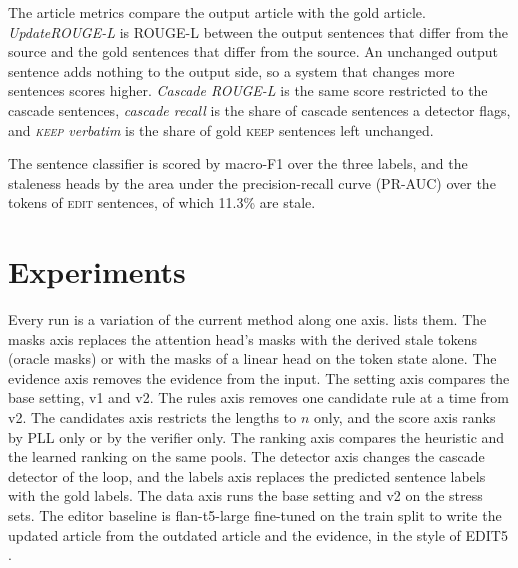 \documentclass[]{paper}
\newcommand{\keep}{\textsc{keep}}
\newcommand{\edit}{\textsc{edit}}
\begin{document}
The article metrics compare the output article with the gold article. \emph{UpdateROUGE-L} \citep{iv-etal-2022-fruit} is ROUGE-L between the output sentences that differ from the source and the gold sentences that differ from the source. An unchanged output sentence adds nothing to the output side, so a system that changes more sentences scores higher. \emph{Cascade ROUGE-L} is the same score restricted to the cascade sentences, \emph{cascade recall} is the share of cascade sentences a detector flags, and \emph{\keep{} verbatim} is the share of gold \keep{} sentences left unchanged.

The sentence classifier is scored by macro-F1 over the three labels, and the staleness heads by the area under the precision-recall curve (PR-AUC) over the tokens of \edit{} sentences, of which 11.3\% are stale.

\section{Experiments}
\label{sec:experiments}

Every run is a variation of the current method along one axis.  lists them. The masks axis replaces the attention head's masks with the derived stale tokens (oracle masks) or with the masks of a linear head on the token state alone. The evidence axis removes the evidence from the input. The setting axis compares the base setting, v1 and v2. The rules axis removes one candidate rule at a time from v2. The candidates axis restricts the lengths to $n$ only, and the score axis ranks by PLL only or by the verifier only. The ranking axis compares the heuristic and the learned ranking on the same pools. The detector axis changes the cascade detector of the loop, and the labels axis replaces the predicted sentence labels with the gold labels. The data axis runs the base setting and v2 on the stress sets. The editor baseline is flan-t5-large fine-tuned on the train split to write the updated article from the outdated article and the evidence, in the style of EDIT5 \citep{iv-etal-2022-fruit}.
\end{document}
